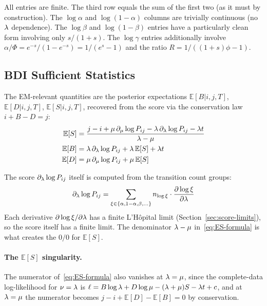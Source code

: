 \noindent
All entries are finite.
The third row equals the sum of the first two (as it must by
construction).
The $\log\alpha$ and $\log(1{-}\alpha)$ columns are trivially
continuous (no $\lambda$ dependence).
The $\log\beta$ and $\log(1{-}\beta)$ entries have a
particularly clean form involving only $s/(1{+}s)$.
The $\log\gamma$ entries additionally involve
$\alpha/\Phi = e^{-s}/(1-e^{-s}) = 1/(e^s - 1)$ and the
ratio $R = 1/((1{+}s)\phi - 1)$.


\subsection{BDI Sufficient Statistics}
\label{sec:lhopital-bdi}

The EM-relevant quantities are the posterior expectations
$\mathbb{E}[B|i,j,T]$, $\mathbb{E}[D|i,j,T]$, $\mathbb{E}[S|i,j,T]$,
recovered from the score via the conservation law $i + B - D = j$:
\begin{align}
\mathbb{E}[S] &= \frac{j - i
  + \mu\,\partial_\mu\log P_{ij}
  - \lambda\,\partial_\lambda\log P_{ij}
  - \lambda t}{\lambda - \mu}
\label{eq:ES-formula} \\
\mathbb{E}[B] &= \lambda\,\partial_\lambda\log P_{ij}
  + \lambda\,\mathbb{E}[S] + \lambda t
\label{eq:EB-formula} \\
\mathbb{E}[D] &= \mu\,\partial_\mu\log P_{ij}
  + \mu\,\mathbb{E}[S]
\label{eq:ED-formula}
\end{align}

The score $\partial_\lambda\log P_{ij}$ itself is computed from
the transition count groups:
\[
\partial_\lambda\log P_{ij}
= \sum_{\xi \in \{\alpha,1{-}\alpha,\beta,\ldots\}}
  n_{\log\xi} \cdot \frac{\partial\log\xi}{\partial\lambda}
\]
Each derivative $\partial\log\xi/\partial\lambda$ has a
finite L'H\^opital limit (Section~\ref{sec:score-limits}),
so the score itself has a finite limit.
The denominator $\lambda - \mu$ in~\eqref{eq:ES-formula}
is what creates the $0/0$ for $\mathbb{E}[S]$.

\paragraph{The $\mathbb{E}[S]$ singularity.}
The numerator of~\eqref{eq:ES-formula} also vanishes
at $\lambda = \mu$, since the complete-data log-likelihood
for $\nu = \lambda$ is
$\ell = B\log\lambda + D\log\mu - (\lambda+\mu)S
- \lambda t + c$,
and at $\lambda = \mu$ the numerator becomes
$j - i + \mathbb{E}[D] - \mathbb{E}[B] = 0$ by conservation.

